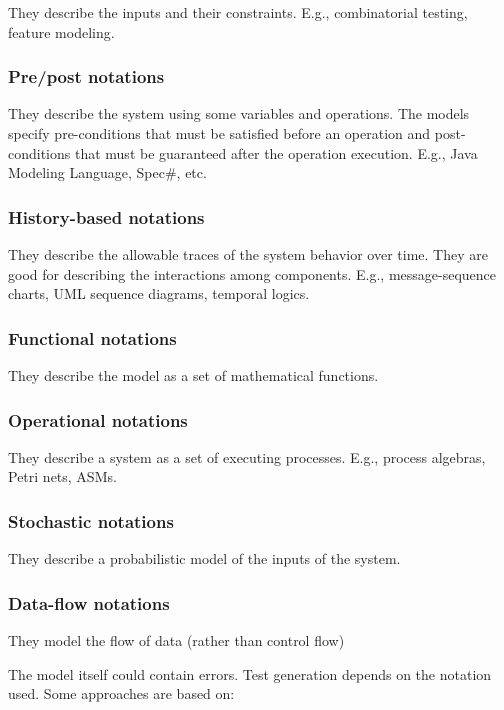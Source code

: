They describe the inputs and their constraints. E.g., combinatorial testing, feature modeling.

\subsubsection{Pre/post notations}

They describe the system using some variables and operations. The models specify pre-conditions that must be satisfied before an operation and post-conditions that must be guaranteed after the operation execution. E.g., Java Modeling Language, Spec\#, etc.

\subsubsection{History-based notations}

They describe the allowable traces of the system behavior over time. They are good for describing the interactions among components. E.g., message-sequence charts, UML sequence diagrams, temporal logics.

\subsubsection{Functional notations}

They describe the model as a set of mathematical functions.

\subsubsection{Operational notations}

They describe a system as a set of executing processes. E.g., process algebras, Petri nets, ASMs.

\subsubsection{Stochastic notations}

They describe a probabilistic model of the inputs of the system.

\subsubsection{Data-flow notations}

They model the flow of data (rather than control flow)

The model itself could contain errors. Test generation depends on the notation used. Some approaches are based on:

